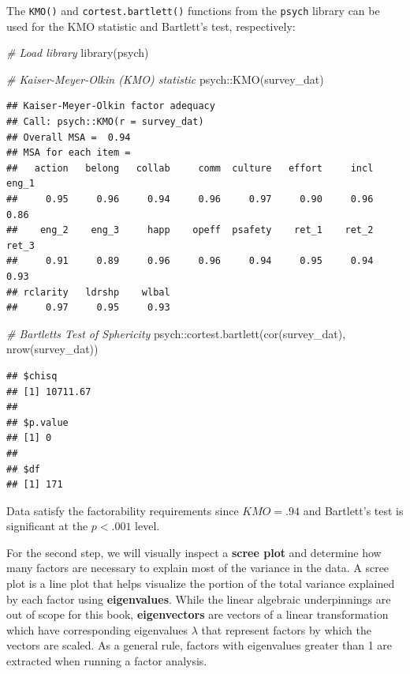 \documentclass[
]{book}
\newenvironment{Shaded}{\begin{snugshade}}{\end{snugshade}}
\newcommand{\CommentTok}[1]{\textcolor[rgb]{0.56,0.35,0.01}{\textit{#1}}}
\newcommand{\FunctionTok}[1]{\textcolor[rgb]{0.00,0.00,0.00}{#1}}
\newcommand{\NormalTok}[1]{#1}
\newcommand{\SpecialCharTok}[1]{\textcolor[rgb]{0.00,0.00,0.00}{#1}}
\begin{document}
The \texttt{KMO()} and \texttt{cortest.bartlett()} functions from the \texttt{psych} library can be used for the KMO statistic and Bartlett's test, respectively:

\begin{Shaded}
\begin{Highlighting}[]
\CommentTok{\# Load library}
\FunctionTok{library}\NormalTok{(psych)}

\CommentTok{\# Kaiser{-}Meyer{-}Olkin (KMO) statistic}
\NormalTok{psych}\SpecialCharTok{::}\FunctionTok{KMO}\NormalTok{(survey\_dat)}
\end{Highlighting}
\end{Shaded}

\begin{verbatim}
## Kaiser-Meyer-Olkin factor adequacy
## Call: psych::KMO(r = survey_dat)
## Overall MSA =  0.94
## MSA for each item = 
##   action   belong   collab     comm  culture   effort     incl    eng_1 
##     0.95     0.96     0.94     0.96     0.97     0.90     0.96     0.86 
##    eng_2    eng_3     happ    opeff  psafety    ret_1    ret_2    ret_3 
##     0.91     0.89     0.96     0.96     0.94     0.95     0.94     0.93 
## rclarity   ldrshp    wlbal 
##     0.97     0.95     0.93
\end{verbatim}

\begin{Shaded}
\begin{Highlighting}[]
\CommentTok{\# Bartlett\textquotesingle{}s Test of Sphericity}
\NormalTok{psych}\SpecialCharTok{::}\FunctionTok{cortest.bartlett}\NormalTok{(}\FunctionTok{cor}\NormalTok{(survey\_dat), }\FunctionTok{nrow}\NormalTok{(survey\_dat))}
\end{Highlighting}
\end{Shaded}

\begin{verbatim}
## $chisq
## [1] 10711.67
## 
## $p.value
## [1] 0
## 
## $df
## [1] 171
\end{verbatim}

Data satisfy the factorability requirements since \(KMO = .94\) and Bartlett's test is significant at the \(p < .001\) level.

For the second step, we will visually inspect a \textbf{scree plot} and determine how many factors are necessary to explain most of the variance in the data. A scree plot is a line plot that helps visualize the portion of the total variance explained by each factor using \textbf{eigenvalues}. While the linear algebraic underpinnings are out of scope for this book, \textbf{eigenvectors} are vectors of a linear transformation which have corresponding eigenvalues \(\lambda\) that represent factors by which the vectors are scaled. As a general rule, factors with eigenvalues greater than 1 are extracted when running a factor analysis.
\end{document}
